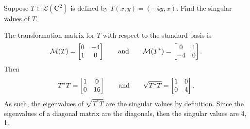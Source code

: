 Suppose $T \in \mathcal{L}(\mathbf{C}^2)$ is defined by $T(x,y) = (-4y,x)$. Find the singular values of $T$.

\soln The transformation matrix for $T$ with respect to the standard basis is 
$$\mathcal{M}(T) = \begin{bmatrix}
    0 & -4 \\ 1 & 0
\end{bmatrix} \qquad \text{and} \qquad \mathcal{M}(T^*) = \begin{bmatrix}
    0 & 1 \\ -4 & 0
\end{bmatrix}.$$
Then
$$T^*T = \begin{bmatrix}
    1 & 0 \\ 0 & 16
\end{bmatrix} \qquad \text{and} \qquad \sqrt{T^*T} = \begin{bmatrix}
    1 & 0 \\ 0 & 4
\end{bmatrix}.
$$
As such, the eigenvalues of $\sqrt{T^*T}$ are the singular values by definition. Since the eigenvalues of a diagonal matrix are the diagonals, then the singular values are 4, 1.